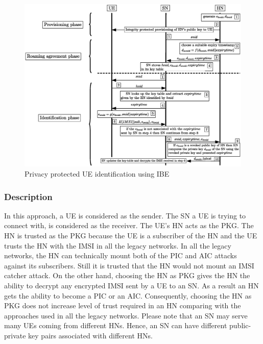 \documentclass[lnicst,sechang,a4paper]{svmultln}
\begin{document}
\begin{figure}
\begin{center}
  \includegraphics[width=.98\textwidth]{solution_based_on_ibc.eps}
\caption{Privacy protected UE identification using IBE}
\label{fig:solution_ibc}       %
\end{center}
\end{figure}

\subsubsection{Description}
In this approach, a UE is considered as the sender. The SN a UE is trying to connect with, is considered as the receiver. The UE's HN acts as the PKG. The HN is trusted as the PKG because the UE is a subscriber of the HN and the UE trusts the HN with the IMSI in all the legacy networks. In all the legacy networks, the HN can technically mount both of the PIC and AIC attacks against its subscribers. Still it is trusted that the HN would not mount an IMSI catcher attack. On the other hand, choosing the HN as PKG gives the HN the ability to decrypt any encrypted IMSI sent by a UE to an SN. As a result an HN gets the ability to become a PIC or an AIC. Consequently, choosing the HN as PKG does not increase level of trust required in an HN comparing with the approaches used in all the legacy networks. Please note that an SN may serve many UEs coming from different HNs. Hence, an SN can have different public-private key pairs associated with different HNs. 
\end{document}
